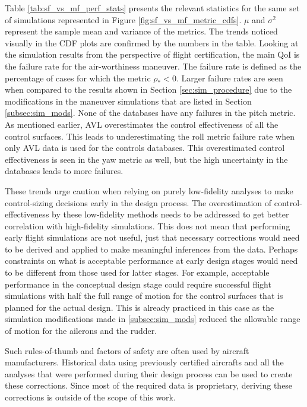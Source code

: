 Table \ref{tab:sf_vs_mf_perf_stats} presents the relevant statistics for the same set of simulations represented in Figure \ref{fig:sf_vs_mf_metric_cdfs}.
$\mu$ and $\sigma^2$ represent the sample mean and variance of the metrics.
The trends noticed visually in the CDF plots are confirmed by the numbers in the table. 
Looking at the simulation results from the perspective of flight certification, the main QoI is the failure rate for the air-worthiness maneuver. 
The failure rate is defined as the percentage of cases for which the metric $\rho_* < 0$.
Larger failure rates are seen when compared to the results shown in Section \ref{sec:sim_procedure} due to the modifications in the maneuver simulations that are listed in Section \ref{subsec:sim_mods}.
None of the databases have any failures in the pitch metric. 
As mentioned earlier, AVL overestimates the control effectiveness of all the control surfaces.
This leads to underestimating the roll metric failure rate when only AVL data is used for the controls databases. 
This overestimated control effectiveness is seen in the yaw metric as well, but the high uncertainty in the databases leads to more failures. 

These trends urge caution when relying on purely low-fidelity analyses to make control-sizing decisions early in the design process.
The overestimation of control-effectiveness by these low-fidelity methods needs to be addressed to get better correlation with high-fidelity simulations. 
This does not mean that performing early flight simulations are not useful, just that necessary corrections would need to be derived and applied to make meaningful inferences from the data. 
Perhaps constraints on what is acceptable performance at early design stages would need to be different from those used for latter stages. 
For example, acceptable performance in the conceptual design stage could require successful flight simulations with half the full range of motion for the control surfaces that is planned for the actual design.
This is already practiced in this case as the simulation modifications made in \ref{subsec:sim_mods} reduced the allowable range of motion for the ailerons and the rudder. 

Such rules-of-thumb and factors of safety are often used by aircraft manufacturers.
Historical data using previously certified aircrafts and all the analyses that were performed during their design process can be used to create these corrections. 
Since most of the required data is proprietary, deriving these corrections is outside of the scope of this work. 

